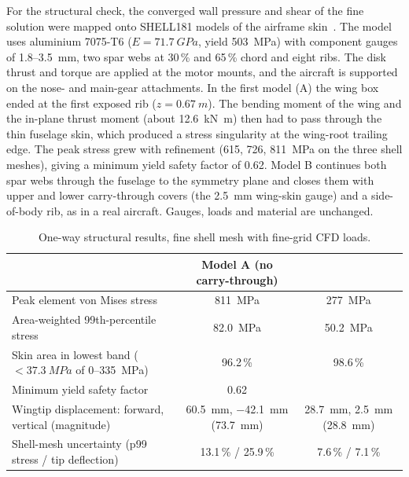\documentclass[10pt,a4paper]{article}
\begin{document}
For the structural check, the converged wall pressure and shear of the fine solution were mapped onto SHELL181 models
of the airframe skin~\cite{ansys2025shell181}. The model uses aluminium 7075-T6 ($E=\SI{71.7}{GPa}$, yield
\SI{503}{MPa}) with component gauges of 1.8--\SI{3.5}{mm}, two spar webs at 30\,\% and 65\,\% chord and eight ribs.
The disk thrust and torque are applied at the motor mounts, and the aircraft is supported on the nose- and main-gear
attachments. In the first model (A) the wing box ended at the first exposed rib ($z=\SI{0.67}{m}$). The bending moment
of the wing and the in-plane thrust moment (about \SI{12.6}{kN.m}) then had to pass through the thin fuselage skin,
which produced a stress singularity at the wing-root trailing edge. The peak stress grew with refinement (615, 726,
\SI{811}{MPa} on the three shell meshes), giving a minimum yield safety factor of 0.62. Model B continues both spar
webs through the fuselage to the symmetry plane and closes them with upper and lower carry-through covers (the
\SI{2.5}{mm} wing-skin gauge) and a side-of-body rib, as in a real aircraft. Gauges, loads and material are
unchanged.

\begin{table}[t]
  \caption{One-way structural results, fine shell mesh with fine-grid CFD loads.}
  \label{tab:fsi}
  \centering\small\setlength{\tabcolsep}{4pt}
  \begin{tabularx}{\textwidth}{L c c}
    \toprule
    & Model A (no carry-through) & \\
    \midrule
    Peak element von Mises stress & \SI{811}{MPa} & \SI{277}{MPa}\\
    Area-weighted 99th-percentile stress & \SI{82.0}{MPa} & \SI{50.2}{MPa}\\
    Skin area in lowest band ($<\SI{37.3}{MPa}$ of 0--\SI{335}{MPa}) & 96.2\,\% & 98.6\,\%\\
    Minimum yield safety factor & 0.62 & \\
    Wingtip displacement: forward, vertical (magnitude) & \SI{60.5}{mm}, \SI{-42.1}{mm} (\SI{73.7}{mm}) & \SI{28.7}{mm}, \SI{+2.5}{mm} (\SI{28.8}{mm})\\
    Shell-mesh uncertainty (p99 stress / tip deflection) & 13.1\,\% / 25.9\,\% & 7.6\,\% / 7.1\,\%\\
    \bottomrule
  \end{tabularx}
\end{table}
\end{document}
